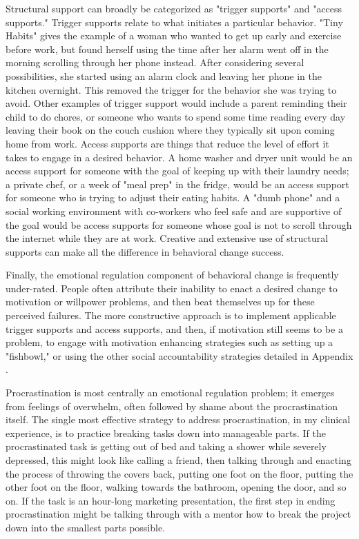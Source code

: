 \documentclass[12pt,letterpaper]{book}
\begin{document}
Structural support can broadly be categorized as "trigger supports" and "access supports." Trigger supports relate to what initiates a particular behavior. "Tiny Habits" gives the example of a woman who wanted to get up early and exercise before work, but found herself using the time after her alarm went off in the morning scrolling through her phone instead. After considering several possibilities, she started using an alarm clock and leaving her phone in the kitchen overnight. This removed the trigger for the behavior she was trying to avoid. Other examples of trigger support would include a parent reminding their child to do chores, or someone who wants to spend some time reading every day leaving their book on the couch cushion where they typically sit upon coming home from work. Access supports are things that reduce the level of effort it takes to engage in a desired behavior. A home washer and dryer unit would be an access support for someone with the goal of keeping up with their laundry needs; a private chef, or a week of "meal prep" in the fridge, would be an access support for someone who is trying to adjust their eating habits. A "dumb phone" and a social working environment with co-workers who feel safe and are supportive of the goal would be access supports for someone whose goal is not to scroll through the internet while they are at work. Creative and extensive use of structural supports can make all the difference in behavioral change success.

Finally, the emotional regulation component of behavioral change is frequently under-rated. People often attribute their inability to enact a desired change to motivation or willpower problems, and then beat themselves up for these perceived failures. The more constructive approach is to implement applicable trigger supports and access supports, and then, if motivation still seems to be a problem, to engage with motivation enhancing strategies such as setting up a "fishbowl," or using the other social accountability strategies detailed in Appendix \todo{}.

Procrastination is most centrally an emotional regulation problem; it emerges from feelings of overwhelm, often followed by shame about the procrastination itself. The single most effective strategy to address procrastination, in my clinical experience, is to practice breaking tasks down into manageable parts. If the procrastinated task is getting out of bed and taking a shower while severely depressed, this might look like calling a friend, then talking through and enacting the process of throwing the covers back, putting one foot on the floor, putting the other foot on the floor, walking towards the bathroom, opening the door, and so on. If the task is an hour-long marketing presentation, the first step in ending procrastination might be talking through with a mentor how to break the project down into the smallest parts possible.
\end{document}
